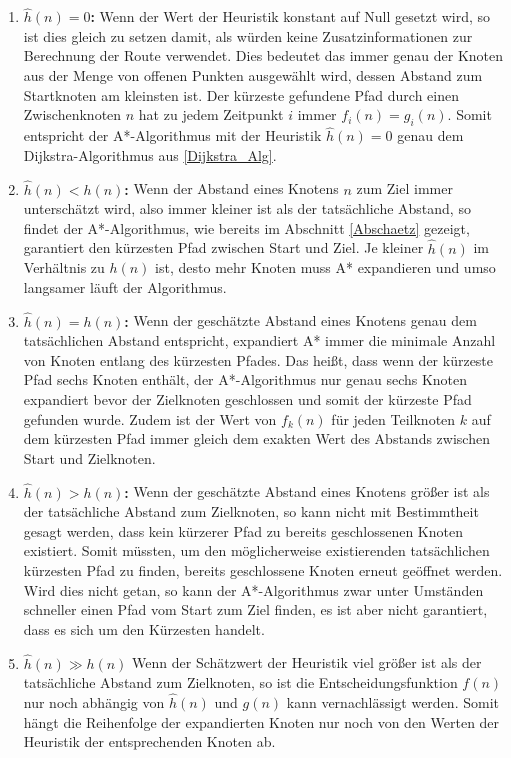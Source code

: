 		\begin{enumerate}
			\item \textbf{$\hat{h}(n)=0$:} Wenn der Wert der Heuristik konstant auf Null gesetzt wird, so ist dies gleich zu setzen damit, als würden keine Zusatzinformationen zur Berechnung der Route verwendet. Dies bedeutet das immer genau der Knoten aus der Menge von offenen Punkten ausgewählt wird, dessen Abstand zum Startknoten am kleinsten ist. Der kürzeste gefundene Pfad durch einen Zwischenknoten $n$ hat zu jedem Zeitpunkt $i$ immer $f_i(n)=g_i(n)$. Somit entspricht der A*-Algorithmus mit der Heuristik $\hat{h}(n)=0$ genau dem Dijkstra-Algorithmus aus \ref{Dijkstra_Alg}.
			
			\item \textbf{$\hat{h}(n)<h(n)$:} Wenn der Abstand eines Knotens $n$ zum Ziel immer unterschätzt wird, also immer kleiner ist als der tatsächliche Abstand, so findet der A*-Algorithmus, wie bereits im Abschnitt \ref{Abschaetz} gezeigt, garantiert den kürzesten Pfad zwischen Start und Ziel. Je kleiner $\hat{h}(n)$ im Verhältnis zu $h(n)$ ist, desto mehr Knoten muss A* expandieren und umso langsamer läuft der Algorithmus.
			
			\item \textbf{$\hat{h}(n)=h(n)$:} Wenn der geschätzte Abstand eines Knotens genau dem tatsächlichen Abstand entspricht, expandiert A* immer die minimale Anzahl von Knoten entlang des kürzesten Pfades. Das heißt, dass wenn der kürzeste Pfad sechs Knoten enthält, der A*-Algorithmus nur genau sechs Knoten expandiert bevor der Zielknoten geschlossen und somit der kürzeste Pfad gefunden wurde. Zudem ist der Wert von $f_k(n)$ für jeden Teilknoten $k$ auf dem kürzesten Pfad immer gleich dem exakten Wert des Abstands zwischen Start und Zielknoten.
			
			\item \textbf{$\hat{h}(n)>h(n)$:} Wenn der geschätzte Abstand eines Knotens größer ist als der tatsächliche Abstand zum Zielknoten, so kann nicht mit Bestimmtheit gesagt werden, dass kein kürzerer Pfad zu bereits geschlossenen Knoten existiert.  Somit müssten, um den möglicherweise existierenden tatsächlichen kürzesten Pfad zu finden, bereits geschlossene Knoten erneut geöffnet werden. Wird dies nicht getan, so kann der A*-Algorithmus zwar unter Umständen schneller einen Pfad vom Start zum Ziel finden, es ist aber nicht garantiert, dass es sich um den Kürzesten handelt.
			
			\item \textbf{$\hat{h}(n)\gg h(n)$} Wenn der Schätzwert der Heuristik viel größer ist als der tatsächliche Abstand zum Zielknoten, so ist die Entscheidungsfunktion $f(n)$ nur noch abhängig von $\hat{h}(n)$ und $g(n)$ kann vernachlässigt werden. Somit hängt die Reihenfolge der expandierten Knoten nur noch von den Werten der Heuristik der entsprechenden Knoten ab.
		\end{enumerate}
		 
